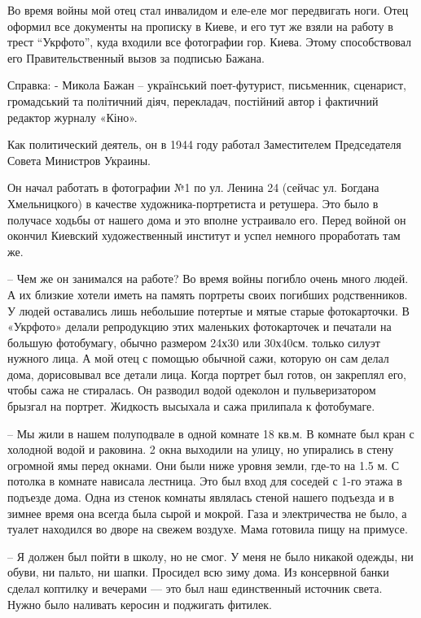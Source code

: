 Во время войны мой отец стал инвалидом и еле-еле мог передвигать ноги. Отец
оформил все документы на прописку в Киеве, и его тут же взяли на работу в трест
“Укрфото”, куда входили все фотографии гор. Киева. Этому способствовал его
Правительственный вызов за подписью Бажана.

Справка: - Микола Бажан – український поет-футурист, письменник, сценарист,
громадський та політичний діяч, перекладач, постійний автор і фактичний
редактор журналу «Кіно».

Как политический деятель, он в 1944 году  работал Заместителем Председателя
Совета Министров Украины.

 Он начал работать в фотографии №1 по ул. Ленина 24 (сейчас ул. Богдана
 Хмельницкого) в качестве художника-портретиста и ретушера. Это было в получасе
 ходьбы от нашего дома и это вполне  устраивало его. Перед войной он окончил
 Киевский художественный институт и успел немного проработать там же. 

– Чем же он занимался на работе? Во время войны погибло очень много людей. А их
близкие хотели иметь на память портреты своих погибших родственников. У людей
оставались лишь небольшие потертые и мятые старые фотокарточки.  В «Укрфото»
делали репродукцию этих маленьких фотокарточек и печатали на большую
фотобумагу, обычно размером 24х30 или 30х40см. только силуэт нужного лица. А
мой отец с помощью обычной сажи, которую он сам  делал дома, дорисовывал все
детали лица. Когда портрет был готов, он закреплял его, чтобы сажа не
стиралась. Он разводил водой одеколон и пульверизатором брызгал на портрет.
Жидкость высыхала и сажа прилипала к фотобумаге.

– Мы жили в нашем полуподвале в одной комнате 18 кв.м. В комнате был кран с
холодной водой и раковина. 2 окна выходили на улицу, но упирались в стену
огромной ямы перед окнами. Они были ниже уровня земли, где-то на 1.5 м. С
потолка в комнате нависала лестница. Это был вход для соседей с 1-го этажа в
подъезде дома. Одна из стенок комнаты являлась стеной нашего подъезда и в
зимнее время она всегда была сырой  и  мокрой.  Газа и  электричества не было,
а туалет находился во дворе на свежем воздухе. Мама готовила пищу на примусе.

– Я должен был пойти в школу, но не смог. У меня не было никакой одежды, ни
обуви, ни пальто, ни шапки. Просидел всю зиму дома. Из консервной банки  сделал
коптилку и  вечерами — это был наш единственный источник света.  Нужно было
наливать керосин и поджигать фитилек.

